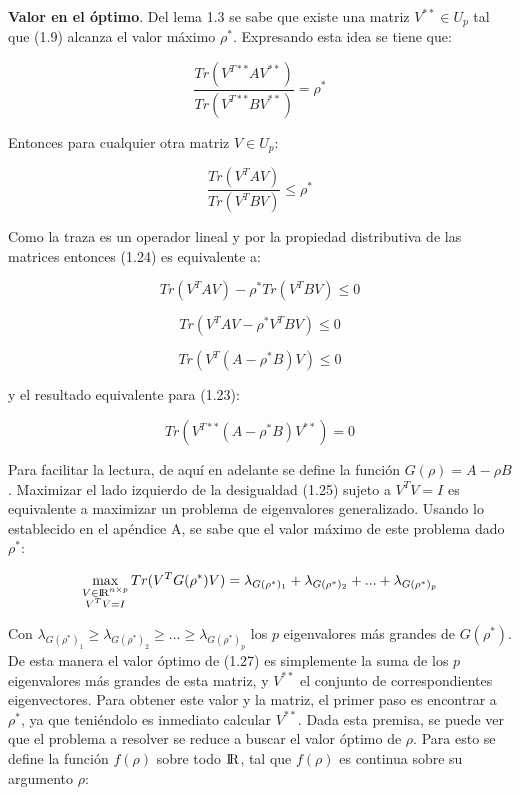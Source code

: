 \textbf{Valor en el óptimo}. Del lema 1.3 se sabe que existe una matriz $V^{**} \in U_p$ tal que (1.9) alcanza el valor máximo $\rho^*$. Expresando esta idea se tiene que:

\begin{equation} \label{eq:2.24}
 \frac{Tr(V^{T**} A V^{**})}{Tr(V^{T**} B V^{**})} = \rho^* 
\end{equation}

Entonces para cualquier otra matriz $V \in U_p $:

\begin{equation}\label{eq:2.25}
 \frac{Tr(V^T A V)}{Tr(V^T B V)} \leq \rho^* 
\end{equation}

Como la traza es un operador lineal y por la propiedad distributiva de las matrices entonces (1.24) es equivalente a:

\begin{equation*}
 Tr(V^T A V)- \rho^* Tr(V^T B V) \leq 0 
\end{equation*}

\begin{equation*}
	Tr(V^T A V- \rho^* V^T B V) \leq 0	
 \end{equation*}

 \begin{equation} \label{eq:2.26}
	Tr(V^T (A - \rho^* B )V) \leq 0	
 \end{equation}

y el resultado equivalente para (1.23):
	
 \begin{equation} \label{eq:2.27}
	Tr(V^{T**} (A - \rho^* B )V^{**}) = 0	
 \end{equation}


Para facilitar la lectura, de aquí en adelante se define la función $G(\rho) = A- \rho B$. Maximizar el lado izquierdo de la desigualdad (1.25) sujeto a $V^T V = I$ es equivalente a maximizar un problema de eigenvalores generalizado. Usando lo establecido en el apéndice A, se sabe que el valor máximo de este problema dado $\rho^*$:

\begin{equation}\label{eq:2.28}
	\max_{\substack{V \in {\rm I\!R}^{n \times p} \\ V^T V = I}} Tr(V^T G(\rho^*) V) = \lambda_{G(\rho^*)_1} + \lambda_{G(\rho^*)_2} + ... + \lambda_{G(\rho^*)_p}
\end{equation}
  
 Con $\lambda_{G(\rho^*)_1} \geq \lambda_{G(\rho^*)_2} \geq ... \geq \lambda_{G(\rho^*)_p}$ los $p$ eigenvalores más grandes de $G(\rho^*)$. De esta manera el valor óptimo de (1.27) es simplemente la suma de los $p$ eigenvalores más grandes de esta matriz, y $V^{**}$ el conjunto de correspondientes eigenvectores. Para obtener este valor y la matriz, el primer paso es encontrar a $\rho^*$, ya que teniéndolo es inmediato calcular $V^{**}$. Dada esta premisa, se puede ver que el problema a resolver se reduce a buscar el valor óptimo de $\rho$. Para esto se define la función $f(\rho)$ sobre todo $\rm I\!R$, tal que $f(\rho)$ es continua sobre su argumento $\rho$: 

